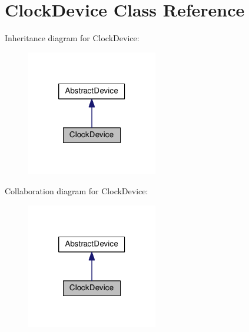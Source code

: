 \hypertarget{classClockDevice}{\section{\-Clock\-Device \-Class \-Reference}
\label{dc/d14/classClockDevice}
}


\-Inheritance diagram for \-Clock\-Device\-:\nopagebreak
\begin{figure}[H]
\begin{center}
\leavevmode
\includegraphics[width=162pt]{de/da0/classClockDevice__inherit__graph}
\end{center}
\end{figure}


\-Collaboration diagram for \-Clock\-Device\-:\nopagebreak
\begin{figure}[H]
\begin{center}
\leavevmode
\includegraphics[width=162pt]{d5/d1e/classClockDevice__coll__graph}
\end{center}
\end{figure}
